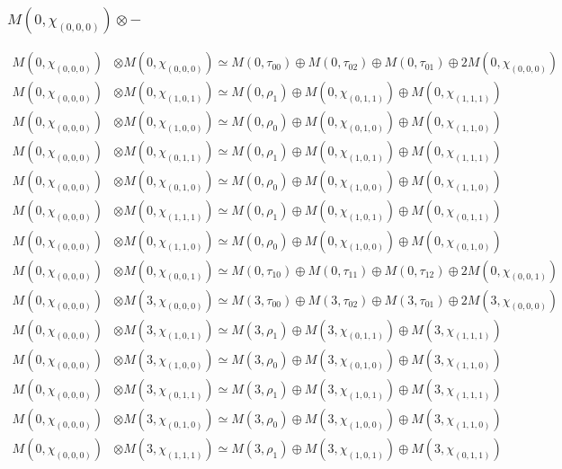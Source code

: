 \subsubsection{$ M(0,\chi_{(0,0,0)})\otimes -$}
\begin{align*}
M(0,\chi_{(0,0,0)}) &\otimes M(0,\chi_{(0,0,0)}) \simeq M(0,\tau_{00}) \oplus M(0,\tau_{02}) \oplus M(0,\tau_{01}) \oplus 2 M(0,\chi_{(0,0,0)})\\
M(0,\chi_{(0,0,0)}) &\otimes M(0,\chi_{(1,0,1)}) \simeq M(0,\rho_{1}) \oplus M(0,\chi_{(0,1,1)}) \oplus M(0,\chi_{(1,1,1)})\\
M(0,\chi_{(0,0,0)}) &\otimes M(0,\chi_{(1,0,0)}) \simeq M(0,\rho_{0}) \oplus M(0,\chi_{(0,1,0)}) \oplus M(0,\chi_{(1,1,0)})\\
M(0,\chi_{(0,0,0)}) &\otimes M(0,\chi_{(0,1,1)}) \simeq M(0,\rho_{1}) \oplus M(0,\chi_{(1,0,1)}) \oplus M(0,\chi_{(1,1,1)})\\
M(0,\chi_{(0,0,0)}) &\otimes M(0,\chi_{(0,1,0)}) \simeq M(0,\rho_{0}) \oplus M(0,\chi_{(1,0,0)}) \oplus M(0,\chi_{(1,1,0)})\\
M(0,\chi_{(0,0,0)}) &\otimes M(0,\chi_{(1,1,1)}) \simeq M(0,\rho_{1}) \oplus M(0,\chi_{(1,0,1)}) \oplus M(0,\chi_{(0,1,1)})\\
M(0,\chi_{(0,0,0)}) &\otimes M(0,\chi_{(1,1,0)}) \simeq M(0,\rho_{0}) \oplus M(0,\chi_{(1,0,0)}) \oplus M(0,\chi_{(0,1,0)})\\
M(0,\chi_{(0,0,0)}) &\otimes M(0,\chi_{(0,0,1)}) \simeq M(0,\tau_{10}) \oplus M(0,\tau_{11}) \oplus M(0,\tau_{12}) \oplus 2 M(0,\chi_{(0,0,1)})\\
M(0,\chi_{(0,0,0)}) &\otimes M(3,\chi_{(0,0,0)}) \simeq M(3,\tau_{00}) \oplus M(3,\tau_{02}) \oplus M(3,\tau_{01}) \oplus 2 M(3,\chi_{(0,0,0)})\\
M(0,\chi_{(0,0,0)}) &\otimes M(3,\chi_{(1,0,1)}) \simeq M(3,\rho_{1}) \oplus M(3,\chi_{(0,1,1)}) \oplus M(3,\chi_{(1,1,1)})\\
M(0,\chi_{(0,0,0)}) &\otimes M(3,\chi_{(1,0,0)}) \simeq M(3,\rho_{0}) \oplus M(3,\chi_{(0,1,0)}) \oplus M(3,\chi_{(1,1,0)})\\
M(0,\chi_{(0,0,0)}) &\otimes M(3,\chi_{(0,1,1)}) \simeq M(3,\rho_{1}) \oplus M(3,\chi_{(1,0,1)}) \oplus M(3,\chi_{(1,1,1)})\\
M(0,\chi_{(0,0,0)}) &\otimes M(3,\chi_{(0,1,0)}) \simeq M(3,\rho_{0}) \oplus M(3,\chi_{(1,0,0)}) \oplus M(3,\chi_{(1,1,0)})\\
M(0,\chi_{(0,0,0)}) &\otimes M(3,\chi_{(1,1,1)}) \simeq M(3,\rho_{1}) \oplus M(3,\chi_{(1,0,1)}) \oplus M(3,\chi_{(0,1,1)})\\

\end{align*}
